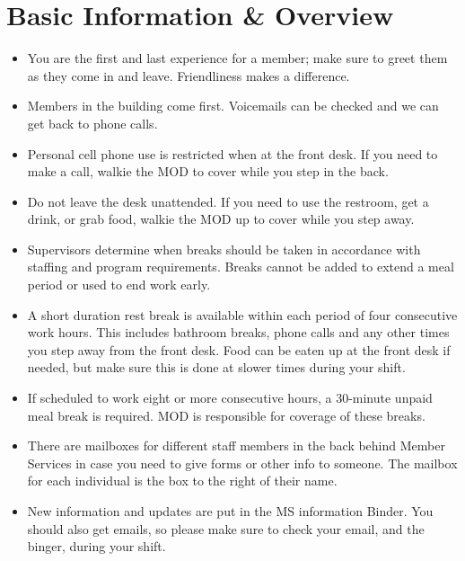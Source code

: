 \documentclass[
]{report}
\author{}
\date{}
\begin{document}
\ifdefined\Shaded\renewenvironment{Shaded}{\begin{tcolorbox}[breakable, interior hidden, borderline west={3pt}{0pt}{shadecolor}, boxrule=0pt, sharp corners, enhanced, frame hidden]}{\end{tcolorbox}}\fi

\hypertarget{basic-information-overview}{%
\chapter{Basic Information \&
Overview}\label{basic-information-overview}}

\begin{itemize}
\item
  You are the first and last experience for a member; make sure to greet
  them as they come in and leave. Friendliness makes a difference.
\item
  Members in the building come first. Voicemails can be checked and we
  can get back to phone calls.
\item
  Personal cell phone use is restricted when at the front desk. If you
  need to make a call, walkie the MOD to cover while you step in the
  back.
\item
  Do not leave the desk unattended. If you need to use the restroom, get
  a drink, or grab food, walkie the MOD up to cover while you step away.
\item
  Supervisors determine when breaks should be taken in accordance with
  staffing and program requirements. Breaks cannot be added to extend a
  meal period or used to end work early.
\item
  A short duration rest break is available within each period of four
  consecutive work hours. This includes bathroom breaks, phone calls and
  any other times you step away from the front desk. Food can be eaten
  up at the front desk if needed, but make sure this is done at slower
  times during your shift.
\item
  If scheduled to work eight or more consecutive hours, a 30-minute
  unpaid meal break is required. MOD is responsible for coverage of
  these breaks.
\item
  There are mailboxes for different staff members in the back behind
  Member Services in case you need to give forms or other info to
  someone. The mailbox for each individual is the box to the right of
  their name.
\item
  New information and updates are put in the MS information Binder. You
  should also get emails, so please make sure to check your email, and
  the binger, during your shift.
\end{itemize}
\end{document}
